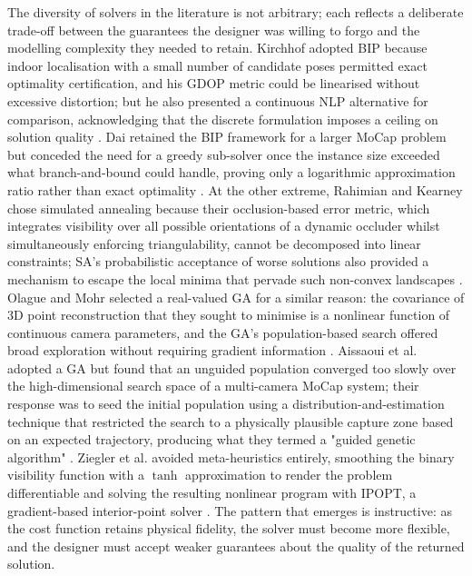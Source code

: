The diversity of solvers in the literature is not arbitrary; each reflects a deliberate trade-off between the guarantees the designer was willing to forgo and the modelling complexity they needed to retain. Kirchhof adopted \gls{BIP} because indoor localisation with a small number of candidate poses permitted exact optimality certification, and his \gls{GDOP} metric could be linearised without excessive distortion; but he also presented a continuous NLP alternative for comparison, acknowledging that the discrete formulation imposes a ceiling on solution quality \parencite{kirchhofOptimalPlacementMultiple2013}. Dai retained the \gls{BIP} framework for a larger \gls{MoCap} problem but conceded the need for a greedy sub-solver once the instance size exceeded what branch-and-bound could handle, proving only a logarithmic approximation ratio rather than exact optimality \parencite{daiOptimalCameraConfiguration}. At the other extreme, Rahimian and Kearney chose simulated annealing because their occlusion-based error metric, which integrates visibility over all possible orientations of a dynamic occluder whilst simultaneously enforcing triangulability, cannot be decomposed into linear constraints; SA's probabilistic acceptance of worse solutions also provided a mechanism to escape the local minima that pervade such non-convex landscapes \parencite{rahimianOptimalCameraPlacement2017}. Olague and Mohr selected a real-valued GA for a similar reason: the covariance of 3D point reconstruction that they sought to minimise is a nonlinear function of continuous camera parameters, and the GA's population-based search offered broad exploration without requiring gradient information \parencite{olagueOptimalCameraPlacement2002}. Aissaoui et al. adopted a GA but found that an unguided population converged too slowly over the high-dimensional search space of a multi-camera \gls{MoCap} system; their response was to seed the initial population using a distribution-and-estimation technique that restricted the search to a physically plausible capture zone based on an expected trajectory, producing what they termed a "guided genetic algorithm" \parencite{aissaouiDesigningCameraPlacement2018}. Ziegler et al. avoided meta-heuristics entirely, smoothing the binary visibility function with a $\tanh$ approximation to render the problem differentiable and solving the resulting nonlinear program with IPOPT, a gradient-based interior-point solver \parencite{zieglerOptimalCameraPlacement2023}. The pattern that emerges is instructive: as the cost function retains physical fidelity, the solver must become more flexible, and the designer must accept weaker guarantees about the quality of the returned solution.


